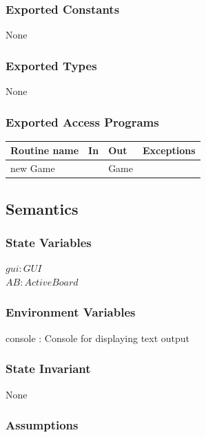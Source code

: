 \documentclass[12pt]{article}
\begin{document}
\subsubsection* {Exported Constants}

None

\subsubsection* {Exported Types}

None

\subsubsection* {Exported Access Programs}

\begin{tabular}{| l | l | l | p{5cm} |}
\hline
\textbf{Routine name} & \textbf{In} & \textbf{Out} & \textbf{Exceptions}\\
\hline
new Game & & Game & ~\\
\hline
\end{tabular}

\subsection* {Semantics}

\subsubsection* {State Variables}

$\mathit{gui}: GUI$\\
$\mathit{AB}: ActiveBoard$

\subsubsection*{Environment Variables}

console : Console for displaying text output

\subsubsection* {State Invariant}

None

\subsubsection* {Assumptions}
\end{document}
